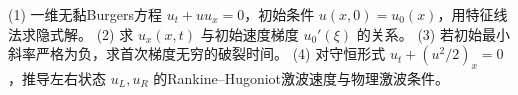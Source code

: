 (1) 一维无黏Burgers方程 \(u_t+u u_x=0\)，初始条件 \(u(x,0)=u_0(x)\)，用特征线法求隐式解。
(2) 求 \(u_x(x,t)\) 与初始速度梯度 \(u_0'(\xi)\) 的关系。
(3) 若初始最小斜率严格为负，求首次梯度无穷的破裂时间。
(4) 对守恒形式 \(u_t+(u^2/2)_x=0\)，推导左右状态 \(u_L,u_R\) 的Rankine–Hugoniot激波速度与物理激波条件。

